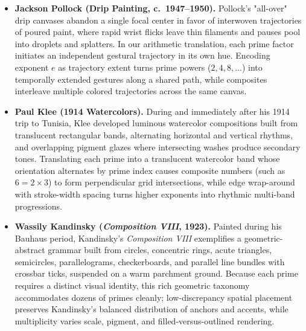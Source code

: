 \documentclass[]{interact}
\theoremstyle{plain}
\theoremstyle{definition}
\theoremstyle{remark}
\begin{document}
\begin{itemize}
  \item \textbf{Jackson Pollock (Drip Painting, c.\ 1947--1950).}
  Pollock's "all-over" drip canvases abandon a single focal center in favor of interwoven trajectories of poured paint, where rapid wrist flicks leave thin filaments and pauses pool into droplets and splatters. In our arithmetic translation, each prime factor initiates an independent gestural trajectory in its own hue. Encoding exponent $e$ as trajectory extent turns prime powers ($2, 4, 8, \dots$) into temporally extended gestures along a shared path, while composites interleave multiple colored trajectories across the same canvas.

  \item \textbf{Paul Klee (1914 Watercolors).}
  During and immediately after his 1914 trip to Tunisia, Klee developed luminous watercolor compositions built from translucent rectangular bands, alternating horizontal and vertical rhythms, and overlapping pigment glazes where intersecting washes produce secondary tones. Translating each prime into a translucent watercolor band whose orientation alternates by prime index causes composite numbers (such as $6 = 2 \times 3$) to form perpendicular grid intersections, while edge wrap-around with stroke-width spacing turns higher exponents into rhythmic multi-band progressions.

  \item \textbf{Wassily Kandinsky (\emph{Composition VIII}, 1923).}
  Painted during his Bauhaus period, Kandinsky's \emph{Composition VIII} exemplifies a geometric-abstract grammar built from circles, concentric rings, acute triangles, semicircles, parallelograms, checkerboards, and parallel line bundles with crossbar ticks, suspended on a warm parchment ground. Because each prime requires a distinct visual identity, this rich geometric taxonomy accommodates dozens of primes cleanly; low-discrepancy spatial placement preserves Kandinsky's balanced distribution of anchors and accents, while multiplicity varies scale, pigment, and filled-versus-outlined rendering.
\end{itemize}
\end{document}
